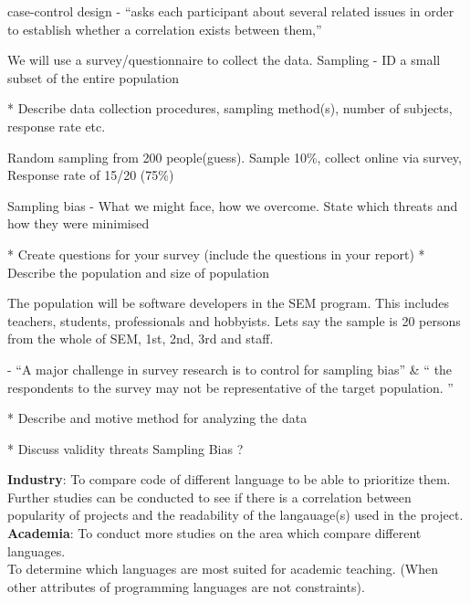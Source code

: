 \documentclass[times, 10pt,twocolumn]{IEEEtran}
\begin{document}
 case-control design - ``asks each participant about several related issues in 
order to establish whether a correlation exists between them,'' \cite{easterbrook2008selecting}

We will use a survey/questionnaire to collect the data.
Sampling - ID a small subset of the entire population

* Describe  data  collection  procedures, sampling  method(s),  number  of  
subjects, response  rate  etc.

Random sampling from 200 people(guess). Sample 10\%, collect online via survey, Response rate of 15/20 (75\%)

Sampling bias - What we might face, how we overcome. State which threats and how they were minimised

* Create  questions for your  survey  (include  the questions in  your  report)
* Describe  the population  and size  of  population

The population will be software developers in the SEM program. This includes teachers, students, professionals and hobbyists. Lets say the sample is 20 persons from the whole of SEM, 1st, 2nd, 3rd and staff.

\cite{easterbrook2008selecting} - ``A major challenge in survey research is to control for sampling bias'' \& `` the respondents to 
the survey may not be representative of the target population. ''

* Describe  and motive  method  for analyzing the data

* Discuss validity  threats
  Sampling Bias ?




\textbf{Industry}: To compare code of different language to be able to prioritize them. \\
Further studies can be conducted to see if there is a correlation between popularity of projects and the readability of the langauage(s) used in the project. \\
\textbf{Academia}: To conduct more studies on the area which compare different languages. \\
To determine which languages are most suited for academic teaching. (When other attributes of programming languages are not constraints).





\end{document}
